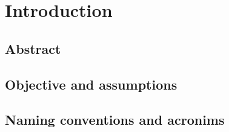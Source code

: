 \chapter{Introduction}
\section{Abstract}
\section{Objective and assumptions}
\section{Naming conventions and acronims}